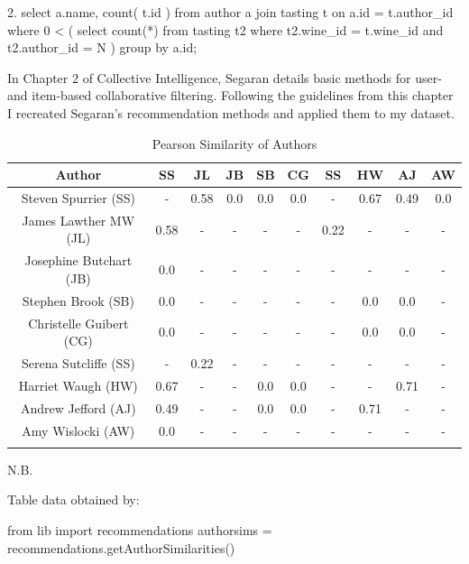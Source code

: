 2. select a.name, count( t.id ) from author a join tasting t on a.id = t.author\_id where 0 < ( select count(*) from tasting t2 where t2.wine\_id = t.wine\_id and t2.author\_id = {N} ) group by a.id; 


In Chapter 2 of Collective Intelligence\cite{Segaran02}, Segaran details basic methods for user- and item-based collaborative filtering. Following the guidelines from this chapter I recreated Segaran's recommendation methods and applied them to my dataset.

\begin{table}[ht]
    \caption{Pearson Similarity of Authors}
    \centering
    \begin{tabular}{c c c c c c c c c c}
        \\\hline\hline
        Author                   & SS   & JL   & JB  & SB  & CG  & SS  & HW   & AJ   & AW
        \\\hline
        Steven Spurrier (SS)     & -    & 0.58 & 0.0 & 0.0 & 0.0 & -    & 0.67 & 0.49 & 0.0 \\
        James Lawther MW (JL)    & 0.58 & -    & -   & -   & -   & 0.22 & -    & -    & -   \\
        Josephine Butchart (JB)  & 0.0  & -    & -   & -   & -   & -    & -    & -    & -   \\
        Stephen Brook (SB)       & 0.0  & -    & -   & -   & -   & -    & 0.0  & 0.0  & -   \\
        Christelle Guibert (CG)  & 0.0  & -    & -   & -   & -   & -    & 0.0  & 0.0  & -   \\
        Serena Sutcliffe (SS)    & -    & 0.22 & -   & -   & -   & -    & -    & -    & -   \\
        Harriet Waugh (HW)       & 0.67 & -    & -   & 0.0 & 0.0 & -    & -    & 0.71 & -   \\
        Andrew Jefford (AJ)      & 0.49 & -    & -   & 0.0 & 0.0 & -    & 0.71 & -    & -   \\
        Amy Wislocki (AW)        & 0.0  & -    & -   & -   & -   & -    & -    & -    & -   \\
        \\\hline
    \end{tabular}
    \label{table:authormatrix}
\end{table}

N.B.

Table data obtained by:

from lib import recommendations
authorsims = recommendations.getAuthorSimilarities()


